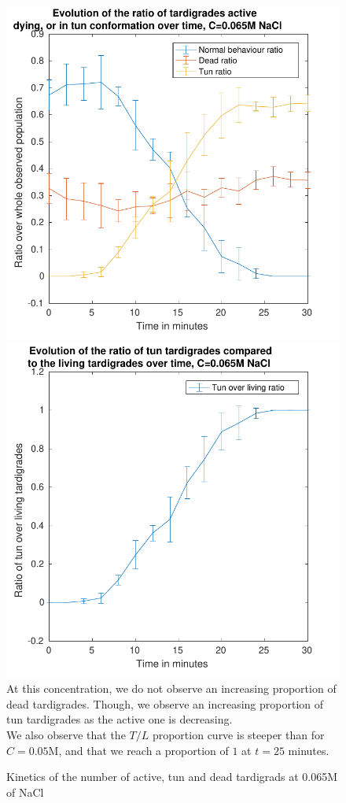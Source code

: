 \documentclass[12pt,a4paper, twocolumn]{article}
\begin{document}
\begin{figure}
\includegraphics[width=\linewidth]{065.pdf}
\includegraphics[width=\linewidth]{065t.pdf}
\label{fig065}
At this concentration, we do not observe an increasing proportion of dead tardigrades. Though, we observe an increasing proportion of tun tardigrades as the active one is decreasing.\\
We also observe that the $T/L$ proportion curve is steeper than for $C=0.05$M, and that we reach a proportion of $1$ at $t=25$ minutes.
\caption{Kinetics of the number of active, tun and dead tardigrads at 0.065M of NaCl}
\end{figure}
\end{document}
